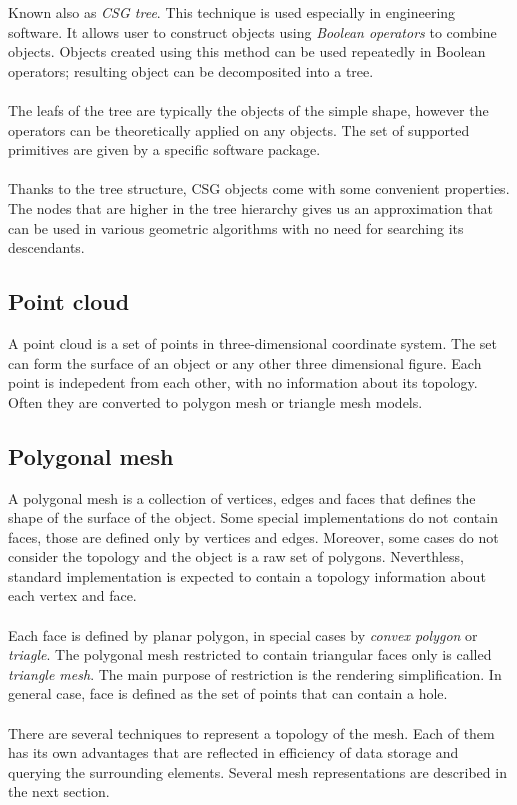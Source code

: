 Known also as \emph{CSG tree}. This technique is used especially in engineering software. It allows
user to construct objects using \emph{Boolean operators} to combine objects. Objects created using this
method can be used repeatedly in Boolean operators; resulting object can be decomposited into a tree.
\\
\\
The leafs of the tree are typically the objects of the simple shape, however the operators can be
theoretically applied on any objects. The set of supported primitives are given by a specific
software package.
\\
\\
Thanks to the tree structure, CSG objects come with some convenient properties. The nodes that
are higher in the tree hierarchy gives us an approximation that can be used in various geometric
algorithms with no need for searching its descendants.

\subsection{Point cloud}

A point cloud is a set of points in three-dimensional coordinate system. The set can form the surface
of an object or any other three dimensional figure. Each point is indepedent
from each other, with no information about its topology. Often they are converted to polygon mesh
or triangle mesh models.

\subsection{Polygonal mesh}

A polygonal mesh is a collection of vertices, edges and faces that defines the shape of the surface of
the object. Some special implementations do not contain faces, those are defined only by vertices and
edges. Moreover, some cases do not consider the topology and the object is a raw set of polygons.
Neverthless, standard implementation is expected to contain a topology information about each vertex
and face.
\\
\\
Each face is defined by planar polygon, in special cases by \emph{convex polygon} or \emph{triagle}.
The polygonal mesh restricted to contain triangular faces only is called \emph{triangle mesh}.
The main purpose of restriction is the rendering simplification. In general case, face is defined
as the set of points that can contain a hole.
\\
\\
There are several techniques to represent a topology of the mesh. Each of them has its own advantages
that are reflected in efficiency of data storage and querying the surrounding elements. Several
mesh representations are described in the next section.

